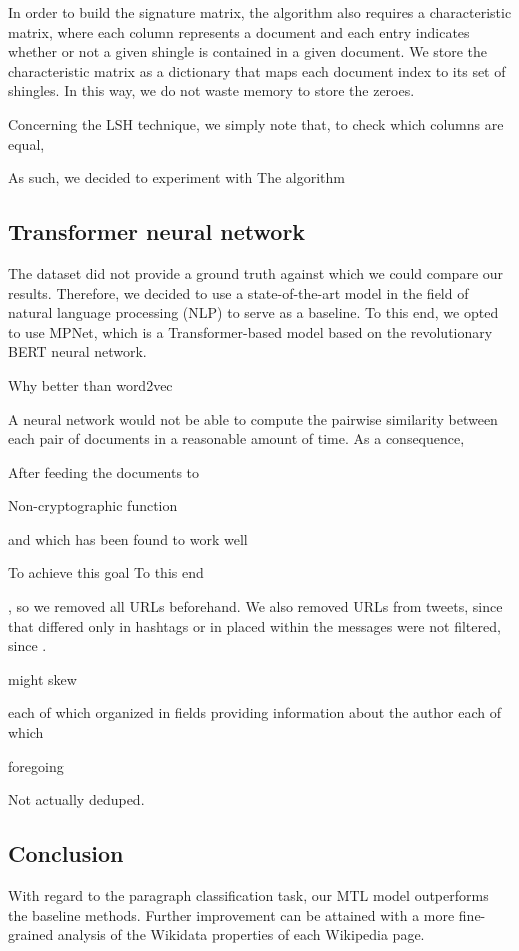 \documentclass[runningheads]{llncs}
\begin{document}
In order to build the signature matrix, the algorithm also requires a characteristic matrix, where each column represents a document and each entry indicates whether or not a given shingle is contained in a given document. We store the characteristic matrix as a dictionary that maps each document index to its set of shingles. In this way, we do not waste memory to store the zeroes.

Concerning the LSH technique, we simply note that, to check which columns are equal, 

As such, we decided to experiment with   
The algorithm 

\subsection{Transformer neural network}
\label{subsec:models:transformer}

The dataset did not provide a ground truth against which we could compare our results. Therefore, we decided to use a state-of-the-art model in the field of natural language processing (NLP) to serve as a baseline. To this end, we opted to use MPNet, which is a Transformer-based model based on the revolutionary BERT neural network. 

Why better than word2vec

A neural network would not be able to compute the pairwise similarity between each pair of documents in a reasonable amount of time. As a consequence, 

After feeding the documents to 

Non-cryptographic function

and which has been found to work well  

To achieve this goal
To this end

, so we removed all URLs 
beforehand. 
We also removed URLs from tweets, since that differed only in hashtags or in  placed within the messages were not filtered, since . 

might skew

each of which organized in fields providing information about the author
each of which  

foregoing

Not actually deduped.

\subsection{Conclusion}

With regard to the paragraph classification task, our MTL model outperforms the baseline methods. Further improvement can be attained with a more fine-grained analysis of the Wikidata properties of each Wikipedia page.
\end{document}
